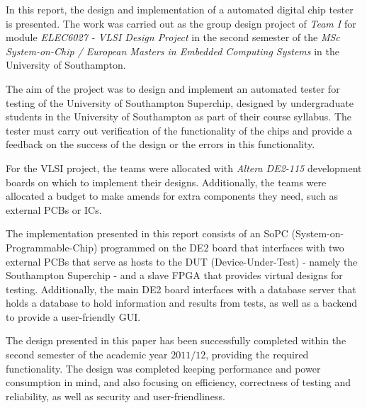In this report, the design and implementation of a automated digital chip tester is presented. The work was carried out as the group design project of \textit{Team I} for module \emph{ELEC6027 - VLSI Design Project} in the second semester of the \textit{MSc System-on-Chip / European Masters in Embedded Computing Systems} in the University of Southampton.

The aim of the project was to design and implement an automated tester for testing of the University of Southampton Superchip, designed by undergraduate students in the University of Southampton as part of their course syllabus. The tester must carry out verification of the functionality of the chips and provide a feedback on the success of the design or the errors in this functionality.

For the VLSI project, the teams were allocated with \textit{Altera DE2-115} development boards on which to implement their designs. Additionally, the teams were allocated a budget to make amends for extra components they need, such as external PCBs or ICs.

The implementation presented in this report consists of an SoPC (System-on-Programmable-Chip) programmed on the DE2 board that interfaces with two external PCBs that serve as hosts to the DUT (Device-Under-Test) - namely the Southampton Superchip - and a slave FPGA that provides virtual designs for testing. Additionally, the main DE2 board interfaces with a database server that holds a database to hold information and results from tests, as well as a backend to provide a user-friendly GUI.

The design presented in this paper has been successfully completed within the second semester of the academic year $2011/12$, providing the required functionality. The design was completed keeping performance and power consumption in mind, and also focusing on efficiency, correctness of testing and reliability, as well as security and user-friendliness.